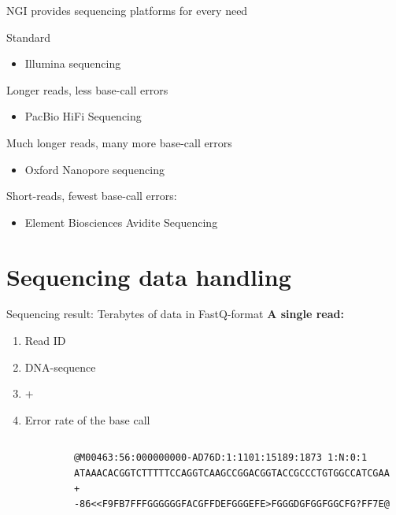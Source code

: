 \documentclass[10pt]{beamer}
\newcommand{\feature}[1]{{\color{scLime} \textbf{#1}}}
\begin{document}
\begin{frame}{NGI provides sequencing platforms for every need}
	\begin{exampleblock}{Standard}
		\begin{itemize}
			\item Illumina sequencing
		\end{itemize}
	\end{exampleblock}
	\begin{alertblock}{Longer reads, less base-call errors}
	\begin{itemize}
		\item PacBio HiFi Sequencing
	\end{itemize}
\end{alertblock}
	\begin{alertblock}{Much longer reads, many more base-call errors}
	\begin{itemize}
		\item Oxford Nanopore sequencing
	\end{itemize}
\end{alertblock}
	\begin{alertblock}{Short-reads, fewest base-call errors:}
		\begin{itemize}
			\item Element Biosciences Avidite Sequencing
		\end{itemize}
	\end{alertblock}
\end{frame}


\section{Sequencing data handling}


\begin{frame}[fragile]{Sequencing result: Terabytes of data in FastQ-format}
	\feature{A single read:}
	\begin{enumerate}
		\item Read ID
		\item DNA-sequence
		\item +
		\item Error rate of the base call
	\end{enumerate}
	\vspace{1em}
	\hrulefill
	\vspace{1em}
\begin{columns}[T]
	\column{\dimexpr\paperwidth-10pt}
		\begin{lstlisting}
			@M00463:56:000000000-AD76D:1:1101:15189:1873 1:N:0:1
			ATAAACACGGTCTTTTTCCAGGTCAAGCCGGACGGTACCGCCCTGTGGCCATCGAA
			+
			-86<<F9FB7FFFGGGGGGFACGFFDEFGGGEFE>FGGGDGFGGFGGCFG?FF7E@
		\end{lstlisting}
\end{columns}
\end{frame}
\end{document}
